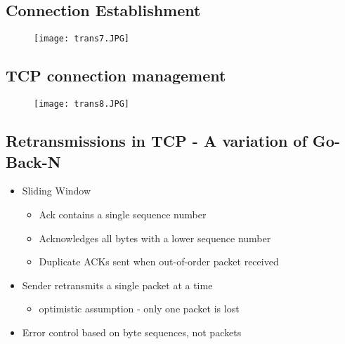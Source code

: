 \documentclass[../resumosRCOM.tex]{subfiles}
\begin{document}
\subsection{Connection Establishment}
\begin{figure}[h]
    \centering
    \texttt{[image: trans7.JPG]}
\end{figure}

\subsection{TCP connection management}
\begin{figure}[h]
    \centering
    \texttt{[image: trans8.JPG]}
\end{figure}

\subsection{Retransmissions in TCP - A variation of Go-Back-N}
\begin{itemize}
    \item Sliding Window
    \begin{itemize}
        \item Ack contains a single sequence number
        \item Acknowledges all bytes with a lower sequence number
        \item Duplicate ACKs sent when out-of-order packet received
    \end{itemize}
    \item  Sender retransmits a single packet at a time
    \begin{itemize}
        \item optimistic assumption - only one packet is lost
    \end{itemize}
    \item Error control based on byte sequences, not packets
\end{itemize}
\end{document}
